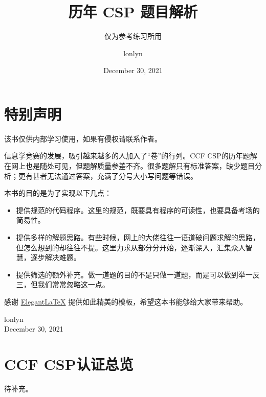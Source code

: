 \documentclass[cn,10pt,math=newtx,citestyle=gb7714-2015,bibstyle=gb7714-2015]{elegantbook}
\title{历年 CSP 题目解析}
\subtitle{仅为参考练习所用}
\author{lonlyn}
\institute{Shanxi University Algorithm Group}
\date{December 30, 2021}
\begin{document}
\maketitle
\frontmatter

\chapter*{特别声明}


该书仅供内部学习使用，如果有侵权请联系作者。

信息学竞赛的发展，吸引越来越多的人加入了“卷”的行列。CCF CSP的历年题解在网上也是随处可见，但题解质量参差不齐。很多题解只有标准答案，缺少题目分析；更有甚者无法通过答案，充满了分号大小写问题等错误。

本书的目的是为了实现以下几点：

\begin{itemize}
  \item 提供规范的代码程序。这里的规范，既要具有程序的可读性，也要具备考场的简易性。
  \item 提供多样的解题思路。有些时候，网上的大佬往往一语道破问题求解的思路，但怎么想到的却往往不提。这里力求从部分分开始，逐渐深入，汇集众人智慧，逐步解决难题。
  \item 提供筛选的额外补充。做一道题的目的不是只做一道题，而是可以做到举一反三，但我们常常忽略这一点。
\end{itemize}

感谢 \href{https://github.com/ElegantLaTeX/ElegantBook}{Elegant\LaTeX{}} 提供如此精美的模板，希望这本书能够给大家带来帮助。

\vskip 1.5cm

\begin{flushright}
  lonlyn\\
  December 30, 2021
\end{flushright}

\tableofcontents

\mainmatter

\chapter{CCF CSP认证总览}

待补充。

\end{document}
